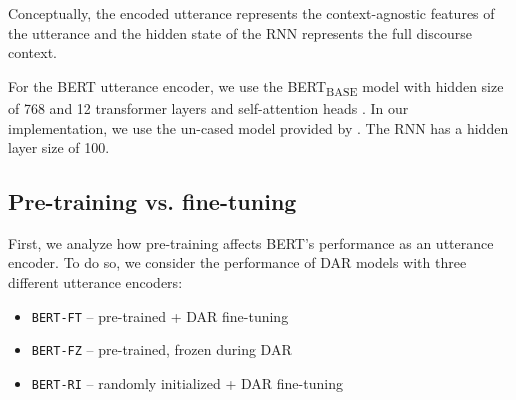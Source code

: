 \documentclass[11pt,a4paper]{article}
\begin{document}
Conceptually, the encoded utterance represents the context-agnostic features of the utterance 
and the hidden state of the RNN represents the full discourse context.


For the BERT utterance encoder, we use the BERT\textsubscript{BASE} model with hidden size of 768 and 12 transformer layers and self-attention heads \citep[][\S3.1]{devlinBERTPretrainingDeep2018}.
In our implementation, we use the un-cased model provided by \citet{wolfHuggingFaceTransformersStateoftheart2019}.
The RNN has a hidden layer size of 100.

\subsection{Pre-training vs. fine-tuning} \label{sec:experiment2} %
First, we analyze how pre-training affects BERT's performance as an utterance encoder.
To do so, we consider the performance of DAR models with three different utterance encoders:
\begin{itemize}
  \item \texttt{BERT-FT} -- pre-trained + DAR fine-tuning 
  \item \texttt{BERT-FZ} -- pre-trained, frozen during DAR
  \item \texttt{BERT-RI} -- randomly initialized + DAR fine-tuning 
\end{itemize}

\end{document}
